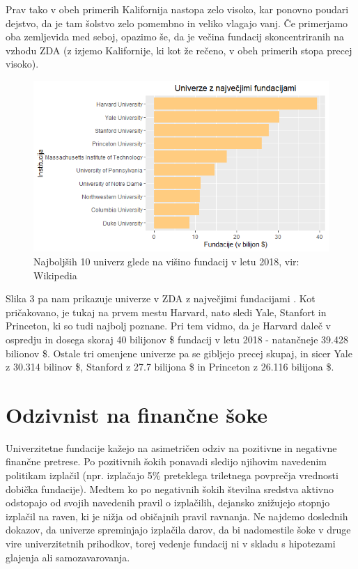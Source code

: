 \documentclass[12pt, a4paper]{article}
\begin{document}
Prav tako v obeh primerih Kalifornija nastopa zelo visoko, kar ponovno poudari dejstvo, da je tam šolstvo zelo pomembno in veliko vlagajo vanj. Če primerjamo oba zemljevida med seboj, opazimo še, da je večina fundacij skoncentriranih na vzhodu ZDA (z izjemo Kalifornije, ki kot že rečeno, v obeh primerih stopa precej visoko).

\begin{figure}[!h]
\centering
\includegraphics[width = 15 cm]{grafi_zemljevidi/top10.png}
\caption{Najboljših 10 univerz glede na višino fundacij v letu 2018, vir: Wikipedia}
\label{Slika 3}
\end{figure}

Slika 3 pa nam prikazuje univerze v ZDA z največjimi fundacijami \cite{wiki}. Kot pričakovano, je tukaj na prvem mestu Harvard, nato sledi Yale, Stanfort in Princeton, ki so tudi najbolj poznane. Pri tem vidmo, da je Harvard daleč v ospredju in dosega skoraj 40 bilijonov \$ fundacij v letu 2018 - natančneje 39.428 bilionov \$. Ostale tri omenjene univerze pa se gibljejo precej skupaj, in sicer Yale z 30.314
bilinov \$, Stanford z 27.7 bilijona \$ in Princeton z 26.116 bilijona \$.


\section[Odzivnost na finančne šoke]{Odzivnist na finančne šoke}

Univerzitetne fundacije kažejo na asimetričen odziv na pozitivne in negativne finančne pretrese. Po pozitivnih šokih ponavadi sledijo njihovim navedenim politikam izplačil (npr. izplačajo 5\% preteklega triletnega povprečja vrednosti dobička fundacije). Medtem ko po negativnih šokih številna sredstva aktivno odstopajo od svojih navedenih pravil o izplačilih, dejansko znižujejo stopnjo izplačil na raven, ki je nižja od običajnih pravil ravnanja. Ne najdemo doslednih dokazov, da univerze spreminjajo izplačila darov, da bi nadomestile šoke v druge vire univerzitetnih prihodkov, torej vedenje fundacij ni v skladu s hipotezami glajenja ali samozavarovanja.
\end{document}
